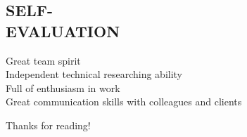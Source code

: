 \documentclass[margin]{res}
\begin{document}
\begin{resume}
\section{SELF-\\EVALUATION}
            Great team spirit\\
            Independent technical researching ability\\
            Full of enthusiasm in work\\
            Great communication skills with colleagues and clients




\hfill Thanks for reading!

\end{resume}
\end{document}

